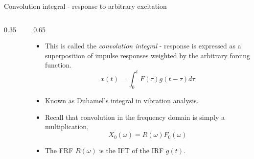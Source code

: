 \documentclass[11pt,aspectratio=169,handout]{beamer}
\begin{document}
\begin{frame}[c]{Convolution integral - response to arbitrary excitation}
	\begin{columns}[T]
		\begin{column}{0.35\textwidth}
			\begin{figure}
				\vspace{-0.4cm}
				\centering
				
			\end{figure}
		\end{column}
		\begin{column}{0.65\textwidth}			
			\begin{itemize}
				\item<1-> This is called the \textit{convolution integral} - response is expressed as a superposition of impulse responses weighted by the arbitrary forcing function.
				\begin{equation}
					x(t) = \int_0^t F(\tau)  g(t-\tau) d\tau
				\end{equation}
			\item<1-> Known as Duhamel's integral in vibration analysis.
			\item<2-> Recall that convolution in the frequency domain is simply a multiplication,
			\begin{equation}
				X_0(\omega)=R(\omega) F_0(\omega)
			\end{equation}
			\item<3-> The FRF $R(\omega)$ is the IFT of the IRF $g(t)$.
			\end{itemize}
		\end{column}
	\end{columns}
\end{frame}
\end{document}
